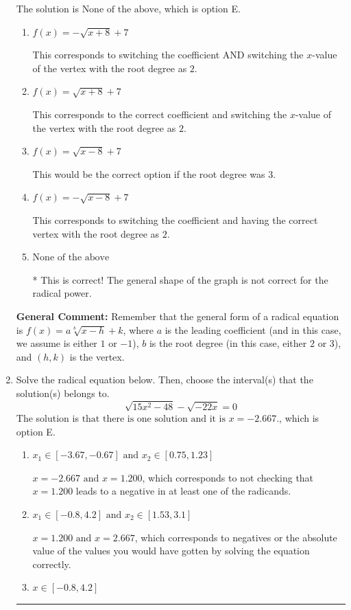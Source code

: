 \documentclass{extbook}[14pt]
\newcommand{\litem}[1]{\item #1

\rule{\textwidth}{0.4pt}}
\begin{document}
\begin{enumerate}
{The solution is \( \text{None of the above} \), which is option E.\begin{enumerate}[label=\Alph*.]
\item \( f(x) = - \sqrt{x + 8} + 7 \)

This corresponds to switching the coefficient AND switching the $x$-value of the vertex with the root degree as $2$.
\item \( f(x) = \sqrt{x + 8} + 7 \)

This corresponds to the correct coefficient and switching the $x$-value of the vertex with the root degree as $2$.
\item \( f(x) = \sqrt{x - 8} + 7 \)

This would be the correct option if the root degree was $3$.
\item \( f(x) = - \sqrt{x - 8} + 7 \)

This corresponds to switching the coefficient and having the correct vertex with the root degree as $2$.
\item \( \text{None of the above} \)

* This is correct! The general shape of the graph is not correct for the radical power.
\end{enumerate}

\textbf{General Comment:} Remember that the general form of a radical equation is $ f(x) = a \sqrt[b]{x - h} + k$, where $a$ is the leading coefficient (and in this case, we assume is either $1$ or $-1$), $b$ is the root degree (in this case, either $2$ or $3$), and $(h, k)$ is the vertex.
}
\litem{
Solve the radical equation below. Then, choose the interval(s) that the solution(s) belongs to.
\[ \sqrt{15 x^2 - 48} - \sqrt{-22 x} = 0 \]The solution is \( \text{that there is one solution and it is } x = -2.667. \), which is option E.\begin{enumerate}[label=\Alph*.]
\item \( x_1 \in [-3.67, -0.67] \text{ and } x_2 \in [0.75,1.23] \)

$x = -2.667 \text{ and } x = 1.200$, which corresponds to not checking that $x = 1.200$ leads to a negative in at least one of the radicands.
\item \( x_1 \in [-0.8, 4.2] \text{ and } x_2 \in [1.53,3.1] \)

$x = 1.200 \text{ and } x = 2.667$, which corresponds to negatives or the absolute value of the values you would have gotten by solving the equation correctly.
\item \( x \in [-0.8,4.2] \)


\end{enumerate}}
\end{enumerate}
\end{document}

